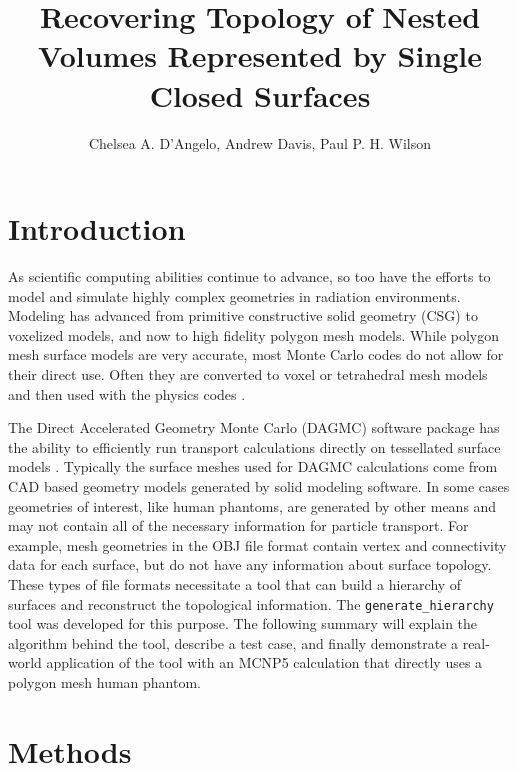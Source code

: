 \documentclass{anstrans}
\title{Recovering Topology of Nested Volumes Represented by Single Closed Surfaces}
\author{Chelsea A. D'Angelo, Andrew Davis, Paul P. H. Wilson}
\institute{
Computational Nuclear Engineering Research Group, University of Wisconsin-Madison, Madison WI}
\begin{document}
\section{Introduction}
As scientific computing abilities continue to advance, so too have the efforts to model
and simulate highly complex geometries in radiation environments.  Modeling has
advanced from primitive constructive solid geometry (CSG) to voxelized models, and now to high fidelity polygon mesh 
models.  While polygon mesh surface models are very accurate, most Monte Carlo codes
do not allow for their direct use. Often they are converted to voxel or tetrahedral 
mesh models and then used with the physics codes \cite{tetmesh}.

The Direct Accelerated Geometry Monte Carlo (DAGMC) software package
has the ability to efficiently run transport calculations directly on tessellated
surface models \cite{dagmc}.  Typically the surface meshes used for DAGMC 
calculations come from CAD based geometry models generated by solid modeling software.
In some cases geometries of interest, like human phantoms, are generated by other 
means and may not contain all of the necessary information for particle transport. 
For example, mesh geometries in the OBJ file format contain vertex and connectivity
data for each surface, but do not have any information about surface topology.  
These types of file formats necessitate a tool that can build a hierarchy of 
surfaces and reconstruct the topological information.  The \texttt{generate\_hierarchy} 
tool was developed for this purpose.  The following summary will explain the algorithm
behind the tool, describe a test case, and finally demonstrate a real-world application
of the tool with an MCNP5 calculation that directly uses a polygon mesh human phantom.
\section{Methods}
\end{document}
